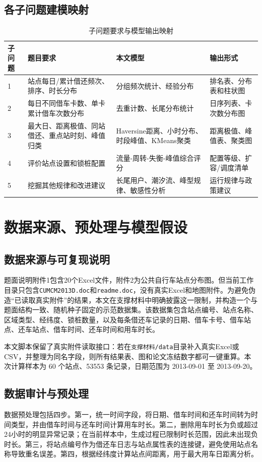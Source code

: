 \documentclass[UTF8,a4paper,12pt]{ctexart}
\begin{document}
\subsection{各子问题建模映射}
\begin{longtable}{p{}p{}p{}p{}}
\caption{子问题要求与模型输出映射}\\
\toprule
子问题 & 题目要求 & 本文模型 & 输出形式\\
\midrule
1 & 站点每日/累计借还频次、排序、时长分布 & 分组频次统计、经验分布 & 排名表、分布表和柱状图\\
2 & 每日不同借车卡数、单卡累计借车次数分布 & 去重计数、长尾分布统计 & 日序列表、卡次数分布图\\
3 & 最大日、距离极值、同站借还、重点站时刻、峰值归类 & Haversine距离、小时分布、时段峰值、KMeans聚类 & 距离极值、峰值表、聚类图\\
4 & 评价站点设置和锁桩配置 & 流量-周转-失衡-峰值综合评分 & 配置等级、扩容/调度清单\\
5 & 挖掘其他规律和改进建议 & 长尾用户、潮汐流、峰型规律、敏感性分析 & 运行规律与政策建议\\
\bottomrule
\end{longtable}

\section{数据来源、预处理与模型假设}
\subsection{数据来源与可复现说明}
题面说明附件1包含20个Excel文件，附件2为公共自行车站点分布图。但当前工作目录只包含\verb|CUMCM2013D.doc|和\verb|readme.doc|，没有真实Excel和地图附件。为避免伪造“已读取真实附件”的结果，本文在支撑材料中明确披露这一限制，并构造一个与题面结构一致、随机种子固定的示范数据集。该数据集包含站点编号、站点名称、区域类型、经纬度、锁桩数量，以及每条借还车记录的日期、借车卡号、借车站点、还车站点、借车时间、还车时间和用车时长。

本文脚本保留了真实附件读取接口：若在\verb|支撑材料/data|目录补入真实Excel或CSV，并整理为同名字段，则所有结果表、图和论文冻结数字都可一键重算。本次计算样本为 60 个站点、53553 条记录，日期范围为 2013-09-01 至 2013-09-20。

\subsection{数据审计与预处理}
数据预处理包括四步。第一，统一时间字段，将日期、借车时间和还车时间转为时间类型，并由借车时间与还车时间计算用车时长。第二，删除用车时长为负或超过24小时的明显异常记录；在当前样本中，生成过程已限制时长范围，因此未出现负时长。第三，将站点编号作为借还车日志与站点属性表的连接键，避免使用站点名称导致重名误差。第四，根据经纬度计算站点间距离，用于最大用车日距离分析。
\end{document}
